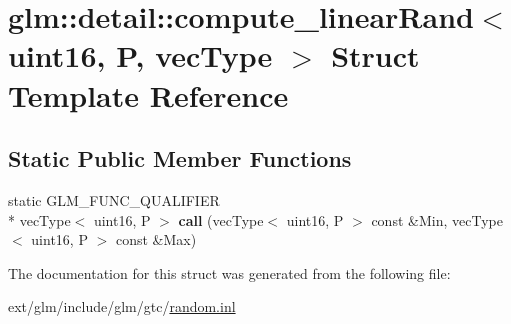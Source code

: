 \hypertarget{structglm_1_1detail_1_1compute__linear_rand_3_01uint16_00_01_p_00_01vec_type_01_4}{\section{glm\-:\-:detail\-:\-:compute\-\_\-linear\-Rand$<$ uint16, P, vec\-Type $>$ Struct Template Reference}
\label{structglm_1_1detail_1_1compute__linear_rand_3_01uint16_00_01_p_00_01vec_type_01_4}
}
\subsection*{Static Public Member Functions}
\begin{DoxyCompactItemize}
\item 
\hypertarget{structglm_1_1detail_1_1compute__linear_rand_3_01uint16_00_01_p_00_01vec_type_01_4_a3a569e5edff462a90e4c2deeeed6f4cf}{static G\-L\-M\-\_\-\-F\-U\-N\-C\-\_\-\-Q\-U\-A\-L\-I\-F\-I\-E\-R \\*
vec\-Type$<$ uint16, P $>$ {\bfseries call} (vec\-Type$<$ uint16, P $>$ const \&Min, vec\-Type$<$ uint16, P $>$ const \&Max)}\label{structglm_1_1detail_1_1compute__linear_rand_3_01uint16_00_01_p_00_01vec_type_01_4_a3a569e5edff462a90e4c2deeeed6f4cf}

\end{DoxyCompactItemize}


The documentation for this struct was generated from the following file\-:\begin{DoxyCompactItemize}
\item 
ext/glm/include/glm/gtc/\hyperlink{random_8inl}{random.\-inl}\end{DoxyCompactItemize}
